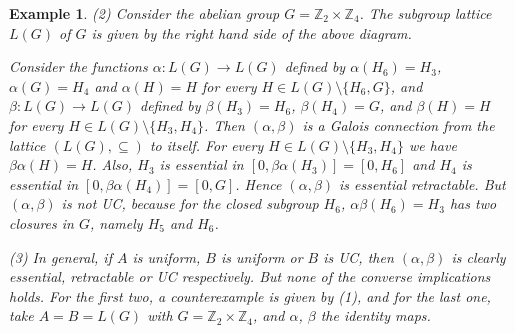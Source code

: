 \documentclass[11pt,a4paper]{amsart}
\newtheorem{ex}[theorem]{Example}
\begin{document}
\begin{ex}
(2)  Consider the abelian group $G=\mathbb{Z}_2\times \mathbb{Z}_4$. The subgroup lattice $L(G)$ of $G$ is given by the
right hand side of the above diagram.

Consider the functions $\alpha:L(G)\to L(G)$ defined by $\alpha(H_6)=H_3$, $\alpha(G)=H_4$ and
$\alpha(H)=H$ for every $H\in L(G)\setminus \{H_6,G\}$, and $\beta:L(G)\to L(G)$ defined by
$\beta(H_3)=H_6$, $\beta(H_4)=G$, and $\beta(H)=H$ for every $H\in L(G)\setminus \{H_3,H_4\}$. Then
$(\alpha,\beta)$ is a Galois connection from the lattice $(L(G),\subseteq)$ to itself. For every $H\in
L(G)\setminus \{H_3,H_4\}$ we have $\beta\alpha(H)=H$. Also, $H_3$ is essential in
$[0,\beta\alpha(H_3)]=[0,H_6]$ and $H_4$ is essential in $[0,\beta\alpha(H_4)]=[0,G]$. Hence
$(\alpha,\beta)$ is essential retractable. But $(\alpha,\beta)$ is not UC, because for the closed subgroup $H_6$,
$\alpha\beta(H_6)=H_3$ has two closures in $G$, namely $H_5$ and $H_6$. 

(3) In general, if $A$ is uniform, $B$ is uniform or $B$ is UC, then $(\alpha,\beta)$ is clearly essential, retractable
or UC respectively. But none of the converse implications holds. For the first two, a counterexample is given by (1),
and for the last one, take $A=B=L(G)$ with $G=\mathbb{Z}_2\times \mathbb{Z}_4$, and $\alpha$, $\beta$ the identity
maps. 
\end{ex}
\end{document}
